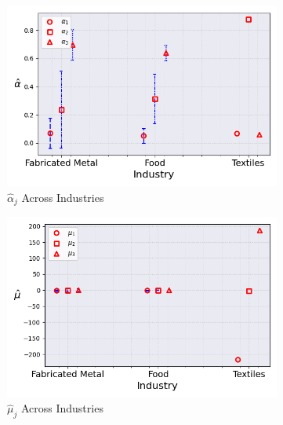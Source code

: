 \documentclass{article}
\begin{document}
\begin{figure}[ht!]
    \centering 
    \caption{AR(1) Normal Model with $\log K$, Import and CIIU Across Industries ($\hat{M}_0 = 3$)}
    \begin{subfigure}[t]{0.32\textwidth}
        \centering
        \includegraphics[width=\textwidth]{figure/ar1_normal_kmshare_ciiu_alpha_across_industries_m3.png}
        \caption{$\hat\alpha_j$ Across Industries}
    \end{subfigure}
    \begin{subfigure}[t]{0.32\textwidth}
        \centering
        \includegraphics[width=\textwidth]{figure/ar1_normal_kmshare_ciiu_mu_across_industries_m3.png}
        \caption{$\hat\mu_j$ Across Industries}
    \end{subfigure}
    \begin{subfigure}[t]{0.32\textwidth}

\end{subfigure}
\end{figure}
\end{document}

